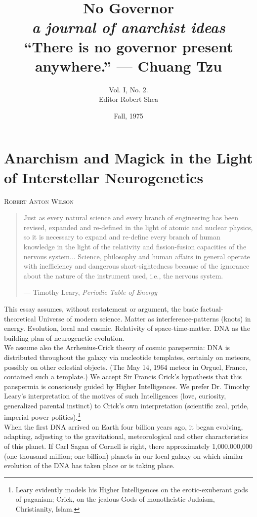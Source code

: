 \documentclass[12pt, onecolumn, letterpaper, oneside]{book}
\title{No Governor\\
		\large \textit{a journal of anarchist ideas}\\
		\vspace{2\baselineskip}
		\normalsize ``There is no governor present anywhere.'' --- Chuang Tzu
		}
\author{Vol. I, No. 2.\\Editor Robert Shea}
\date{Fall, 1975}
\makeatletter
\newcommand\chapterauthor[1]{\authortoc{#1}\printchapterauthor{#1}}
\newcommand{\printchapterauthor}[1]{%
  {\parindent0pt\vspace*{-25pt}%
  \linespread{1.1}\large\scshape#1%
  \par\nobreak\vspace*{35pt}}
  \@afterheading%
}
\newcommand{\authortoc}[1]{%
  \addtocontents{toc}{\vskip-10pt}%
  \addtocontents{toc}{%
    \protect\contentsline{chapter}%
    {\hskip1.3em\mdseries\scshape\protect\scriptsize#1}{}{}}
  \addtocontents{toc}{\vskip5pt}%
}
\makeatother
\begin{document}
\sloppy

\maketitle

\tableofcontents

\chapter[Anarchism and Magick]{Anarchism and Magick in the Light of Interstellar Neurogenetics}
\chapterauthor{Robert Anton Wilson}

\blockquote{Just as every natural science and every branch of engineering has been revised, expanded and re-defined in the light of atomic and nuclear physics, so it is necessary to expand and re-define every branch of human knowledge in the light of the relativity and fission-fusion capacities of the nervous system... Science, philosophy and human affairs in general operate with inefficiency and dangerous short-sightedness because of the ignorance about the nature of the instrument used, i.e., the nervous system.
\par\begin{flushright} --- Timothy Leary, \emph{Periodic Table of Energy} \end{flushright}
}
This essay assumes, without restatement or argument, the basic factual-theoretical Universe of modern science. Matter as interference-patterns (knots) in energy. Evolution, local and cosmic. Relativity of space-time-matter. DNA as the building-plan of neurogenetic evolution.\\
We assume also the Arrhenius-Crick theory of cosmic panspermia: DNA is distributed throughout the galaxy via nucleotide templates, certainly on meteors, possibly on other celestial objects. (The May 14, 1964 meteor in Orguel, France, contained such a template.) We accept Sir Francis Crick's hypothesis that this panspermia is consciously guided by Higher Intelligences. We prefer Dr. Timothy Leary's interpretation of the motives of such Intelligences (love, curiosity, generalized parental instinct) to Crick's own interpretation (scientific zeal, pride, imperial power-politics).\footnote{Leary evidently models his Higher Intelligences on the erotic-exuberant gods of paganism; Crick, on the jealous Gods of monotheistic Judaism, Christianity, Islam.}\\
When the first DNA arrived on Earth four billion years ago, it began evolving, adapting, adjusting to the gravitational, meteorological and other characteristics of this planet. If Carl Sagan of Cornell is right, there approximately 1,000,000,000 (one thousand million; one billion) planets in our local galaxy on which similar evolution of the DNA has taken place or is taking place.\\
\end{document}
